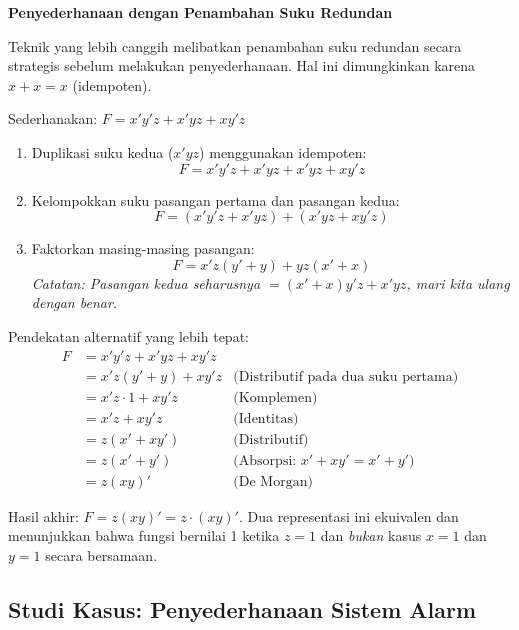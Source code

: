 \begin{contoh}
\textbf{Penyederhanaan dengan Penambahan Suku Redundan}

Teknik yang lebih canggih melibatkan penambahan suku redundan secara strategis sebelum melakukan penyederhanaan. Hal ini dimungkinkan karena $x + x = x$ (idempoten).

Sederhanakan: $F = x'y'z + x'yz + xy'z$

\begin{enumerate}
    \item Duplikasi suku kedua ($x'yz$) menggunakan idempoten:
    \[ F = x'y'z + x'yz + x'yz + xy'z \]
    \item Kelompokkan suku pasangan pertama dan pasangan kedua:
    \[ F = (x'y'z + x'yz) + (x'yz + xy'z) \]
    \item Faktorkan masing-masing pasangan:
    \[ F = x'z(y' + y) + yz(x' + x) \]
    \textit{Catatan: Pasangan kedua seharusnya $= (x' + x)y'z + x'yz$, mari kita ulang dengan benar.}
\end{enumerate}

Pendekatan alternatif yang lebih tepat:
\begin{align*}
F &= x'y'z + x'yz + xy'z \\
  &= x'z(y' + y) + xy'z & \text{(Distributif pada dua suku pertama)} \\
  &= x'z \cdot 1 + xy'z & \text{(Komplemen)} \\
  &= x'z + xy'z & \text{(Identitas)} \\
  &= z(x' + xy') & \text{(Distributif)} \\
  &= z(x' + y') & \text{(Absorpsi: } x' + xy' = x' + y') \\
  &= z(xy)' & \text{(De Morgan)}
\end{align*}

Hasil akhir: $F = z(xy)' = z \cdot (xy)'$. Dua representasi ini ekuivalen dan menunjukkan bahwa fungsi bernilai 1 ketika $z = 1$ dan \emph{bukan} kasus $x = 1$ dan $y = 1$ secara bersamaan.
\end{contoh}

\subsection{Studi Kasus: Penyederhanaan Sistem Alarm}

